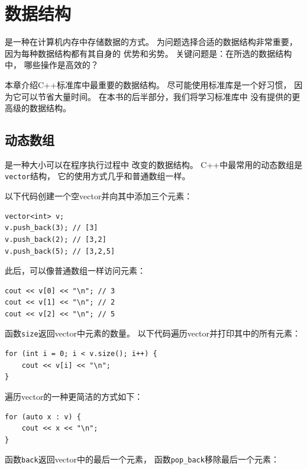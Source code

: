 \chapter{数据结构}


是一种在计算机内存中存储数据的方式。
为问题选择合适的数据结构非常重要，
因为每种数据结构都有其自身的
优势和劣势。
关键问题是：在所选的数据结构中，
哪些操作是高效的？

本章介绍C++标准库中最重要的数据结构。
尽可能使用标准库是一个好习惯，
因为它可以节省大量时间。
在本书的后半部分，我们将学习标准库中
没有提供的更高级的数据结构。

\section{动态数组}


是一种大小可以在程序执行过程中
改变的数据结构。
C++中最常用的动态数组是
\texttt{vector}结构，
它的使用方式几乎和普通数组一样。

以下代码创建一个空vector并向其中添加三个元素：

\begin{lstlisting}
vector<int> v;
v.push_back(3); // [3]
v.push_back(2); // [3,2]
v.push_back(5); // [3,2,5]
\end{lstlisting}

此后，可以像普通数组一样访问元素：

\begin{lstlisting}
cout << v[0] << "\n"; // 3
cout << v[1] << "\n"; // 2
cout << v[2] << "\n"; // 5
\end{lstlisting}

函数\texttt{size}返回vector中元素的数量。
以下代码遍历vector并打印其中的所有元素：

\begin{lstlisting}
for (int i = 0; i < v.size(); i++) {
    cout << v[i] << "\n";
}
\end{lstlisting}

\begin{samepage}
遍历vector的一种更简洁的方式如下：

\begin{lstlisting}
for (auto x : v) {
    cout << x << "\n";
}
\end{lstlisting}
\end{samepage}

函数\texttt{back}返回vector中的最后一个元素，
函数\texttt{pop\_back}移除最后一个元素：

